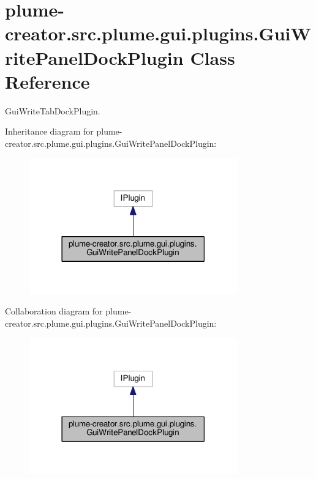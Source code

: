 \hypertarget{classplume-creator_1_1src_1_1plume_1_1gui_1_1plugins_1_1_gui_write_panel_dock_plugin}{}\section{plume-\/creator.src.\+plume.\+gui.\+plugins.\+Gui\+Write\+Panel\+Dock\+Plugin Class Reference}
\label{classplume-creator_1_1src_1_1plume_1_1gui_1_1plugins_1_1_gui_write_panel_dock_plugin}


Gui\+Write\+Tab\+Dock\+Plugin.  




Inheritance diagram for plume-\/creator.src.\+plume.\+gui.\+plugins.\+Gui\+Write\+Panel\+Dock\+Plugin\+:\nopagebreak
\begin{figure}[H]
\begin{center}
\leavevmode
\includegraphics[width=254pt]{classplume-creator_1_1src_1_1plume_1_1gui_1_1plugins_1_1_gui_write_panel_dock_plugin__inherit__graph}
\end{center}
\end{figure}


Collaboration diagram for plume-\/creator.src.\+plume.\+gui.\+plugins.\+Gui\+Write\+Panel\+Dock\+Plugin\+:\nopagebreak
\begin{figure}[H]
\begin{center}
\leavevmode
\includegraphics[width=254pt]{classplume-creator_1_1src_1_1plume_1_1gui_1_1plugins_1_1_gui_write_panel_dock_plugin__coll__graph}
\end{center}
\end{figure}
